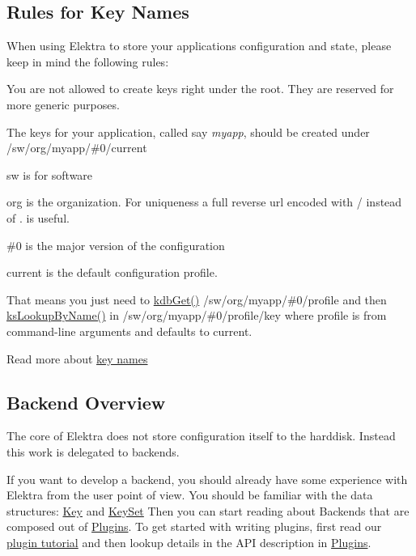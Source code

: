 \subsection*{Rules for Key Names}

When using Elektra to store your application\textquotesingle{}s configuration and state, please keep in mind the following rules\+:
\begin{DoxyItemize}
\item You are not allowed to create keys right under the root. They are reserved for more generic purposes.
\item The keys for your application, called say {\itshape myapp}, should be created under {\ttfamily /sw/org/myapp/\#0/current}
\begin{DoxyItemize}
\item sw is for software
\item org is the organization. For uniqueness a full reverse url encoded with \textquotesingle{}/\textquotesingle{} instead of \textquotesingle{}.\textquotesingle{} is useful.
\item {\ttfamily \#0} is the major version of the configuration
\item current is the default configuration profile.
\item That means you just need to \hyperlink{group__kdb_ga28e385fd9cb7ccfe0b2f1ed2f62453a1}{kdb\+Get()} {\ttfamily /sw/org/myapp/\#0/profile} and then \hyperlink{group__keyset_gad2e30fb6d4739d917c5abb2ac2f9c1a1}{ks\+Lookup\+By\+Name()} in {\ttfamily /sw/org/myapp/\#0/profile/key} where profile is from command-\/line arguments and defaults to current.
\end{DoxyItemize}
\end{DoxyItemize}

Read more about \hyperlink{md_doc_help_elektra-key-names_doc_help_elektra-key-names_md}{key names}

\subsection*{Backend Overview}

The core of Elektra does not store configuration itself to the harddisk. Instead this work is delegated to backends.

If you want to develop a backend, you should already have some experience with Elektra from the user point of view. You should be familiar with the data structures\+: \hyperlink{group__key}{Key} and \hyperlink{group__keyset}{Key\+Set} Then you can start reading about Backends that are composed out of \hyperlink{group__plugin}{Plugins}. To get started with writing plugins, first read our \hyperlink{doc_tutorials_plugins_md}{plugin tutorial} and then lookup details in the A\+PI description in \hyperlink{group__plugin}{Plugins}.

